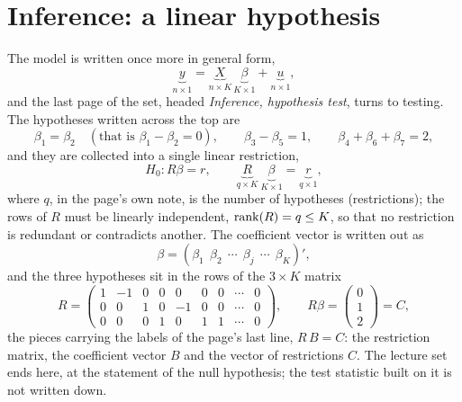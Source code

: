 \documentclass[11pt]{article}
\begin{document}
\section{Inference: a linear hypothesis}

The model is written once more in general form,
\[ \underbrace{y}_{n\times1} = \underbrace{X}_{n\times K}\,
   \underbrace{\beta}_{K\times1} + \underbrace{u}_{n\times1}, \]
and the last page of the set, headed \emph{Inference, hypothesis test}, turns to
testing. The hypotheses written across the top are
\[ \beta_{1} = \beta_{2} \quad(\text{that is } \beta_{1} - \beta_{2} = 0), \qquad
   \beta_{3} - \beta_{5} = 1, \qquad \beta_{4} + \beta_{6} + \beta_{7} = 2, \]
and they are collected into a single linear restriction,
\[ H_{0} : R\beta = r, \qquad
   \underbrace{R}_{q\times K}\ \underbrace{\beta}_{K\times1}
   = \underbrace{r}_{q\times1}, \]
where $q$, in the page's own note, is the number of hypotheses (restrictions); the
rows of $R$ must be linearly independent, $\operatorname{rank}(R) = q \le K$, so that no
restriction is redundant or contradicts another. The coefficient
vector is written out as
\[ \beta = (\beta_{1}\ \ \beta_{2}\ \ \cdots\ \ \beta_{j}\ \ \cdots\ \ \beta_{K})', \]
and the three hypotheses sit in the rows of the $3\times K$ matrix
\[
R = \begin{pmatrix}
      1 & -1 & 0 & 0 & 0 & 0 & 0 & \cdots & 0\\[2pt]
      0 &  0 & 1 & 0 & -1 & 0 & 0 & \cdots & 0\\[2pt]
      0 &  0 & 0 & 1 & 0 & 1 & 1 & \cdots & 0
    \end{pmatrix},
\qquad
R\beta = \begin{pmatrix} 0 \\ 1 \\ 2 \end{pmatrix} = C,
\]
the pieces carrying the labels of the page's last line, $R\,B = C$: the restriction
matrix, the coefficient vector $B$ and the vector of restrictions $C$. The lecture
set ends here, at the statement of the null hypothesis; the test statistic built on
it is not written down.
\end{document}
